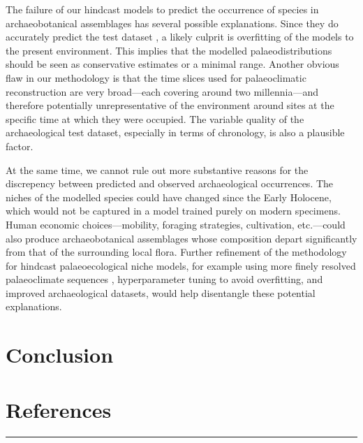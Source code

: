 \documentclass[
  authoryear,
  review]{elsarticle}
\begin{document}
The failure of our hindcast models to predict the occurrence of species
in archaeobotanical assemblages has several possible explanations. Since
they do accurately predict the test dataset , a likely culprit is
overfitting of the models to the present environment. This implies that
the modelled palaeodistributions should be seen as conservative
estimates or a minimal range. Another obvious flaw in our methodology is
that the time slices used for palaeoclimatic reconstruction are very
broad---each covering around two millennia---and therefore potentially
unrepresentative of the environment around sites at the specific time at
which they were occupied. The variable quality of the archaeological
test dataset, especially in terms of chronology, is also a plausible
factor.

At the same time, we cannot rule out more substantive reasons for the
discrepency between predicted and observed archaeological occurrences.
The niches of the modelled species could have changed since the Early
Holocene, which would not be captured in a model trained purely on
modern specimens. Human economic choices---mobility, foraging
strategies, cultivation, etc.---could also produce archaeobotanical
assemblages whose composition depart significantly from that of the
surrounding local flora. Further refinement of the methodology for
hindcast palaeoecological niche models, for example using more finely
resolved palaeoclimate sequences \citep{KargerEtAl2023}, hyperparameter
tuning to avoid overfitting, and improved archaeological datasets, would
help disentangle these potential explanations.

\section{Conclusion}\label{conclusion}

\section{References}\label{references}

\begin{center}\rule{0.5\linewidth}{0.5pt}\end{center}


  
\end{document}
